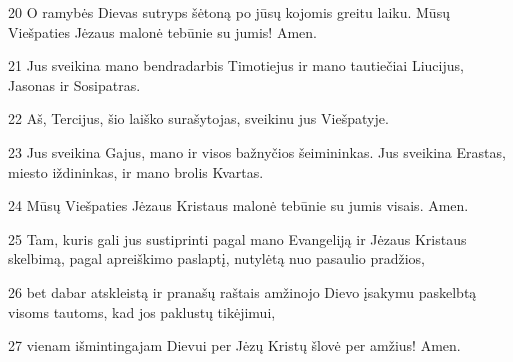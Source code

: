 \par 20 O ramybės Dievas sutryps šėtoną po jūsų kojomis greitu laiku. Mūsų Viešpaties Jėzaus malonė tebūnie su jumis! Amen. 
\par 21 Jus sveikina mano bendradarbis Timotiejus ir mano tautiečiai Liucijus, Jasonas ir Sosipatras. 
\par 22 Aš, Tercijus, šio laiško surašytojas, sveikinu jus Viešpatyje. 
\par 23 Jus sveikina Gajus, mano ir visos bažnyčios šeimininkas. Jus sveikina Erastas, miesto iždininkas, ir mano brolis Kvartas. 
\par 24 Mūsų Viešpaties Jėzaus Kristaus malonė tebūnie su jumis visais. Amen. 
\par 25 Tam, kuris gali jus sustiprinti pagal mano Evangeliją ir Jėzaus Kristaus skelbimą, pagal apreiškimo paslaptį, nutylėtą nuo pasaulio pradžios, 
\par 26 bet dabar atskleistą ir pranašų raštais amžinojo Dievo įsakymu paskelbtą visoms tautoms, kad jos paklustų tikėjimui,­ 
\par 27 vienam išmintingajam Dievui per Jėzų Kristų šlovė per amžius! Amen.




